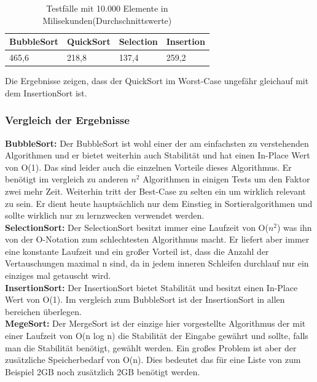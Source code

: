 \documentclass{article}
\begin{document}
\begin{table}[h]
\centering
\begin{tabular}{llll}
\hline
\textbf{BubbleSort} & \textbf{QuickSort} & \textbf{Selection} & \textbf{Insertion} \\
\hline
 465,6 & 218,8 & 137,4 & 259,2 \\
\hline
\end{tabular}
\caption{Testfälle mit 10.000 Elemente in Milisekunden(Durchschnittswerte) }
\label{tab:WC_QS}
\end{table}

Die Ergebnisse zeigen, dass der QuickSort im Worst-Case ungefähr gleichauf mit dem InsertionSort ist.


\subsubsection{Vergleich der Ergebnisse}

\textbf{BubbleSort:} Der BubbleSort ist wohl einer der am einfachsten zu verstehenden Algorithmen und er bietet weiterhin auch Stabilität und hat einen In-Place Wert von O(1). Das sind leider auch die einzelnen Vorteile dieses Algorithmus. Er benötigt im vergleich zu anderen  $n^{2}$ Algorithmen in einigen Tests um den Faktor zwei mehr Zeit. Weiterhin tritt der Best-Case zu selten ein um wirklich relevant zu sein. Er dient heute hauptsächlich nur dem Einstieg in Sortieralgorithmen und sollte wirklich nur zu lernzwecken verwendet werden.\\

\textbf{SelectionSort:} Der SelectionSort besitzt immer eine Laufzeit von O($n^{2}$) was ihn von der O-Notation zum schlechtesten Algorithmus macht. Er liefert aber immer eine konstante Laufzeit und ein großer Vorteil ist, dass die Anzahl der Vertauschungen maximal n sind, da in jedem inneren Schleifen durchlauf nur ein einziges mal getauscht wird. \\

\textbf{InsertionSort:} Der InsertionSort bietet Stabilität und besitzt einen In-Place Wert von O(1). Im vergleich zum BubbleSort ist der InsertionSort in allen bereichen überlegen.\\

\textbf{MegeSort:} Der MergeSort ist der einzige hier vorgestellte Algorithmus der mit einer Laufzeit von O(n log n) die Stabilität der Eingabe gewährt und sollte, falls man die Stabilität benötigt, gewählt werden.  Ein großes Problem ist aber der zusätzliche Speicherbedarf von O(n). Dies bedeutet das für eine Liste von zum Beispiel 2GB noch zusätzlich 2GB benötigt werden.\\
\end{document}

